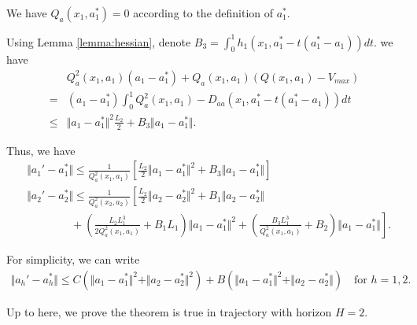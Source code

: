 \documentclass{article} %
\newcommand{\vmax}{V_{max}}
\newcommand{\bigspace}{\qquad\qquad}
\begin{document}
We have $ Q_a(x_1,a_1^*)  = 0$ according to the definition of $a_1^*$.

Using Lemma \ref{lemma:hessian}, denote $B_3 = \int_0^1 h_1(x_1, a_1^*-t(a_1^*-a_1))dt  $. we have 
\begin{align}
    &Q_a^2(x_1, a_1)(a_1 - a_1^*) + Q_a(x_1,a_1)(Q(x_1, a_1)-\vmax) \\ 
    = & (a_1 - a_1^*) \int_0^1 Q_a^2(x_1,a_1) -  D_{aa}(x_1, a_1^* - t(a_1^* - a_1))dt \\
    \le & \Vert a_1 - a_1^*\Vert^2\frac{L_2}{2} +   B_3\Vert a_1 - a_1^*\Vert.
\end{align}

Thus, we have
\begin{align}
    &\Vert a_1' - a_1^*\Vert \le \frac{1}{Q_a^2(x_1, a_1)}\left[\frac{L_2}{2}\Vert a_1 - a_1^* \Vert^2 + B_3\Vert a_1 - a_1^* \Vert\right]\\
    &\Vert a_2' - a_2^*\Vert \le \frac{1}{Q_a^2(x_2, a_2)} \left[\frac{L_2}{2} \Vert a_2 - a_2^* \Vert^2 + B_1\Vert a_2 - a_2^* \Vert \right.\\
     & \left. \bigspace + \left(\frac{L_2 L_1^3}{2 Q_a^2(x_1, a_1)} + B_1 L_1\right)\Vert a_1 - a_1^* \Vert^2 + \left(\frac{B_3 L_1^3}{ Q_a^2(x_1, a_1)} + B_2  \right)\Vert a_1 - a_1^* \Vert\right].
\end{align}



For simplicity, we can write
\begin{align}
    \Vert a_h' - a_h^*\Vert  \le C  (\Vert a_1 - a_1^* \Vert^2 + \Vert a_2 - a_2^* \Vert^2 )+ B(\Vert a_1 - a_1^* \Vert^2 + \Vert a_2 - a_2^* \Vert  ) \quad \text{for } h= 1,2 .
\end{align}
 

Up to here, we prove the theorem is true in trajectory with horizon $H=2$.
\end{document}
